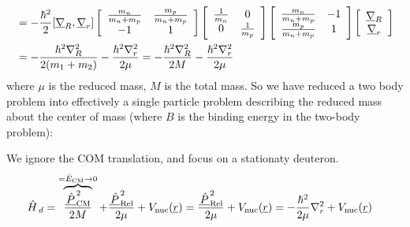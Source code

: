 \documentclass{school-22.101-notes}
\begin{document}
\begin{enumerate}
\begin{align}
 &= - \frac{\hbar^2}{2} [ \underline{\nabla}_R, \underline{\nabla}_r] 
\left[ \begin{array}{cc} \frac{m_n}{m_n+m_p} & \frac{m_p}{m_n+ m_p} \\ -1 & 1 \end{array} \right]
\left[ \begin{array}{cc} \frac{1}{m_n} & 0 \\ 0 & \frac{1}{m_p} \end{array} \right] 
\left[ \begin{array}{cc} \frac{m_n}{m_n+m_p} & -1 \\ \frac{m_p}{m_n+ m_p} & 1 \end{array} \right]
\left[ \begin{array}{c} \underline{\nabla}_R \\ \underline{\nabla}_r \end{array} \right] \\
&= - \frac{\hbar^2 \nabla^2_R}{2 (m_1 + m_2)} - \frac{\hbar^2 \nabla^2_r}{2 \mu} = - \frac{\hbar^2 \nabla^2_R}{2M} - \frac{\hbar^2 \nabla^2_r}{2 \mu} 
\end{align}
where $\mu$ is the reduced mass, $M$ is the total mass. So we have reduced a two body problem into effectively a single particle problem describing the reduced mass about the center of mass (where $B$ is the binding energy in the two-body problem): 

We ignore the COM translation, and focus on a stationaty deuteron. 
\begin{align}
\left. \hat{H} \right._d &= \overbrace{\frac{\underline{\left. \hat{P} \right.}_{\mathrm{CM}}^2}{2M}}^{ = \hat{E}_{\mathrm{CM}} \to  0} + \frac{\underline{\left. \hat{P} \right.}_{\mathrm{Rel}}^2}{2\mu} + V_{\mathrm{nuc}} (\underline{r}) = \frac{\underline{\left. \hat{P} \right.}_{\mathrm{Rel}}^2}{2\mu} + V_{\mathrm{nuc}} (\underline{r}) = -\frac{\hbar^2}{2 \mu} \nabla_r^2 + V_{\mathrm{nuc}} (\underline{r}) 
\end{align}



\end{enumerate}
\end{document}
